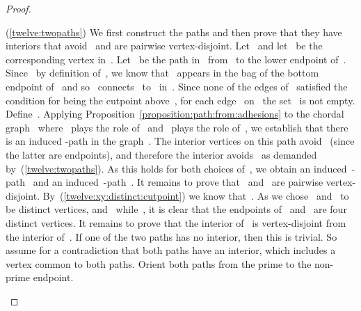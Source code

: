 \begin{proof}
\begin{claimproof}

(\ref{twelve:twopaths}) We first construct the paths and then prove that they have interiors that avoid~ and are pairwise vertex-disjoint. Let~ and let~ be the corresponding vertex in~. Let~ be the path in~ from~ to the lower endpoint of~. Since~ by definition of~, we know that~ appears in the bag of the bottom endpoint of~ and so~ connects~ to~ in~. Since none of the edges of~ satisfied the condition for being the cutpoint above~, for each edge~ on~ the set~ is not empty. Define~. Applying Proposition~\ref{proposition:path:from:adhesions} to the chordal graph~ where~ plays the role of~ and~ plays the role of~, we establish that there is an induced -path in the graph~. The interior vertices on this path avoid~ (since the latter are endpoints), and therefore the interior avoids~ as demanded by~(\ref{twelve:twopaths}). As this holds for both choices of~, we obtain an induced~-path~ and an induced~-path~. It remains to prove that~ and~ are pairwise vertex-disjoint. By~(\ref{twelve:xy:distinct:cutpoint}) we know that~. As we chose~ and~ to be distinct vertices, and~ while~, it is clear that the endpoints of~ and~ are four distinct vertices. It remains to prove that the interior of~ is vertex-disjoint from the interior of~. If one of the two paths has no interior, then this is trivial. So assume for a contradiction that both paths have an interior, which includes a vertex common to both paths. Orient both paths from the prime to the non-prime endpoint.


\end{claimproof}
\end{proof}
